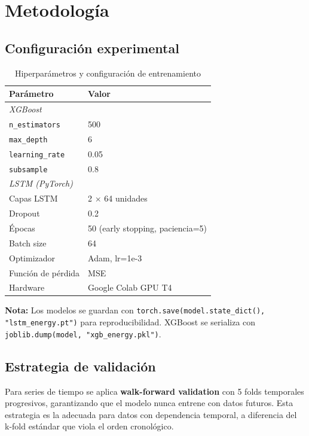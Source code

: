 \documentclass[10pt,twocolumn]{article}
\newcommand{\nota}[1]{%
  \vspace{4pt}
  \noindent\colorbox{eafitblue!8}{%
    \begin{minipage}{\columnwidth-2\fboxsep}
      \small\color{eafitblue!80}\textbf{Nota:} #1
    \end{minipage}
  }
  \vspace{4pt}
}
\begin{document}
\section{Metodología}

\subsection{Configuración experimental}

\begin{table}[H]
\centering
\caption{Hiperparámetros y configuración de entrenamiento}
\label{tab:hparams}
\begin{tabularx}{\columnwidth}{lX}
\toprule
\textbf{Parámetro} & \textbf{Valor} \\
\midrule
\multicolumn{2}{l}{\textit{XGBoost}} \\
\texttt{n\_estimators} & 500 \\
\texttt{max\_depth} & 6 \\
\texttt{learning\_rate} & 0.05 \\
\texttt{subsample} & 0.8 \\
\midrule
\multicolumn{2}{l}{\textit{LSTM (PyTorch)}} \\
Capas LSTM & 2 $\times$ 64 unidades \\
Dropout & 0.2 \\
Épocas & 50 (early stopping, paciencia=5) \\
Batch size & 64 \\
Optimizador & Adam, lr=1e-3 \\
Función de pérdida & MSE \\
\midrule
Hardware & Google Colab GPU T4 \\
\bottomrule
\end{tabularx}
\end{table}

\nota{Los modelos se guardan con \texttt{torch.save(model.state\_dict(),
  "lstm\_energy.pt")} para reproducibilidad. XGBoost se serializa
  con \texttt{joblib.dump(model, "xgb\_energy.pkl")}.}

\subsection{Estrategia de validación}

Para series de tiempo se aplica \textbf{walk-forward validation}
con 5 folds temporales progresivos, garantizando que el modelo
nunca entrene con datos futuros. Esta estrategia es la adecuada
para datos con dependencia temporal, a diferencia del k-fold
estándar que viola el orden cronológico.
\end{document}

